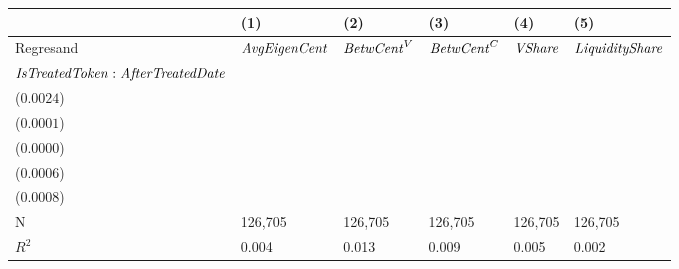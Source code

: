\begin{tabular}{llllll}
\toprule
{} &                                      (1) &                                      (2) &                                      (3) &                                      (4) &                                      (5) \\
\midrule
Regresand                                     &                     ${\it AvgEigenCent}$ &                       ${\it BetwCent}^V$ &                       ${\it BetwCent}^C$ &                           ${\it VShare}$ &                   ${\it LiquidityShare}$ \\
${\it IsTreatedToken}:{\it AfterTreatedDate}$ &  \makecell{$0.0205^{***}$ \\ ($0.0024$)} &  \makecell{$0.0004^{***}$ \\ ($0.0001$)} &  \makecell{$0.0001^{***}$ \\ ($0.0000$)} &  \makecell{$0.0055^{***}$ \\ ($0.0006$)} &  \makecell{$0.0080^{***}$ \\ ($0.0008$)} \\
\midrule N                                    &                                  126,705 &                                  126,705 &                                  126,705 &                                  126,705 &                                  126,705 \\
$R^2$                                         &                                    0.004 &                                    0.013 &                                    0.009 &                                    0.005 &                                    0.002 \\
\bottomrule
\end{tabular}
